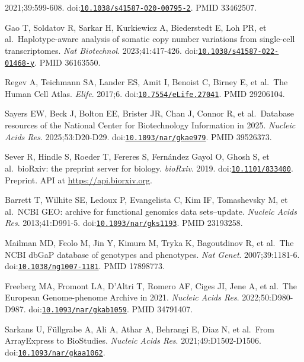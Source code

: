 \documentclass[11pt]{article}
\begin{document}
\begin{enumerate}[label={[\arabic*]},leftmargin=2.6em,labelsep=0.5em,itemsep=1.5pt]
  2021;39:599-608.
  doi:\href{https://doi.org/10.1038/s41587-020-00795-2}{\nolinkurl{10.1038/s41587-020-00795-2}}.
  PMID 33462507.
\item
  Gao T, Soldatov R, Sarkar H, Kurkiewicz A, Biederstedt E, Loh PR, et
  al.~Haplotype-aware analysis of somatic copy number variations from
  single-cell transcriptomes. \emph{Nat Biotechnol}. 2023;41:417-426.
  doi:\href{https://doi.org/10.1038/s41587-022-01468-y}{\nolinkurl{10.1038/s41587-022-01468-y}}.
  PMID 36163550.
\item
  Regev A, Teichmann SA, Lander ES, Amit I, Benoist C, Birney E, et
  al.~The Human Cell Atlas. \emph{Elife}. 2017;6.
  doi:\href{https://doi.org/10.7554/eLife.27041}{\nolinkurl{10.7554/eLife.27041}}.
  PMID 29206104.
\item
  Sayers EW, Beck J, Bolton EE, Brister JR, Chan J, Connor R, et
  al.~Database resources of the National Center for Biotechnology
  Information in 2025. \emph{Nucleic Acids Res}. 2025;53:D20-D29.
  doi:\href{https://doi.org/10.1093/nar/gkae979}{\nolinkurl{10.1093/nar/gkae979}}.
  PMID 39526373.
\item
  Sever R, Hindle S, Roeder T, Fereres S, Fernández Gayol O, Ghosh S, et
  al.~bioRxiv: the preprint server for biology. \emph{bioRxiv}. 2019.
  doi:\href{https://doi.org/10.1101/833400}{\nolinkurl{10.1101/833400}}. Preprint.
  API at \url{https://api.biorxiv.org}.
\item
  Barrett T, Wilhite SE, Ledoux P, Evangelista C, Kim IF, Tomashevsky M,
  et al.~NCBI GEO: archive for functional genomics data sets--update.
  \emph{Nucleic Acids Res}. 2013;41:D991-5.
  doi:\href{https://doi.org/10.1093/nar/gks1193}{\nolinkurl{10.1093/nar/gks1193}}.
  PMID 23193258.
\item
  Mailman MD, Feolo M, Jin Y, Kimura M, Tryka K, Bagoutdinov R, et
  al.~The NCBI dbGaP database of genotypes and phenotypes. \emph{Nat
  Genet}. 2007;39:1181-6.
  doi:\href{https://doi.org/10.1038/ng1007-1181}{\nolinkurl{10.1038/ng1007-1181}}.
  PMID 17898773.
\item
  Freeberg MA, Fromont LA, D'Altri T, Romero AF, Ciges JI, Jene A, et
  al.~The European Genome-phenome Archive in 2021. \emph{Nucleic Acids
  Res}. 2022;50:D980-D987.
  doi:\href{https://doi.org/10.1093/nar/gkab1059}{\nolinkurl{10.1093/nar/gkab1059}}.
  PMID 34791407.
\item
  Sarkans U, Füllgrabe A, Ali A, Athar A, Behrangi E, Diaz N, et
  al.~From ArrayExpress to BioStudies. \emph{Nucleic Acids Res}.
  2021;49:D1502-D1506.
  doi:\href{https://doi.org/10.1093/nar/gkaa1062}{\nolinkurl{10.1093/nar/gkaa1062}}.

\end{enumerate}
\end{document}
